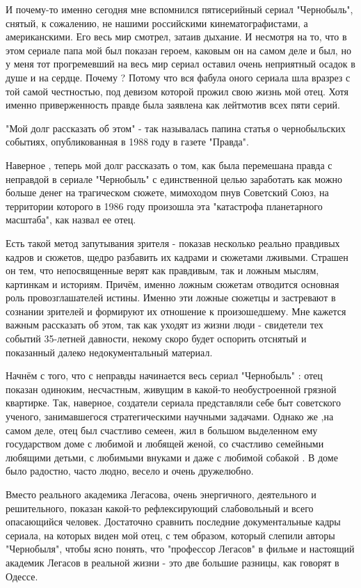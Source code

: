 И почему-то именно сегодня мне вспомнился пятисерийный сериал "Чернобыль",
снятый, к сожалению, не нашими российскими кинематографистами, а американскими.
Его весь мир смотрел, затаив дыхание. И несмотря на то, что в этом сериале папа
мой был показан героем, каковым он на самом деле и был, но у меня тот
прогремевший на весь мир сериал оставил очень неприятный осадок в душе и на
сердце. Почему ? Потому что вся фабула оного сериала шла вразрез с той самой
честностью, под девизом которой прожил свою жизнь мой отец. Хотя именно
приверженность правде была заявлена как лейтмотив всех пяти серий. 

"Мой долг рассказать об этом" - так называлась папина статья о чернобыльских
событиях, опубликованная в 1988 году в газете "Правда". 

Наверное , теперь мой долг рассказать о том, как была перемешана правда с
неправдой в сериале "Чернобыль" с единственной целью заработать как можно
больше денег на трагическом сюжете, мимоходом пнув Советский Союз, на
территории которого в 1986 году произошла эта "катастрофа планетарного
масштаба", как назвал ее отец. 

Есть такой метод запутывания зрителя - показав несколько реально правдивых
кадров и сюжетов, щедро разбавить их кадрами и сюжетами лживыми. Страшен он
тем, что непосвященные верят как правдивым, так и ложным мыслям, картинкам и
историям. Причём, именно ложным сюжетам отводится основная роль
провозглашателей истины. Именно эти ложные сюжетцы и застревают в сознании
зрителей и формируют их отношение к произошедшему. Мне кажется важным
рассказать об этом, так как уходят из жизни люди - свидетели тех событий
35-летней давности, некому скоро будет оспорить отснятый и показанный далеко
недокументальный материал. 

Начнём с того, что с неправды начинается весь сериал "Чернобыль" : отец показан
одиноким, несчастным, живущим в какой-то необустроенной грязной квартирке. Так,
наверное, создатели сериала представляли себе быт советского ученого,
занимавшегося стратегическими научными задачами. Однако же ,на самом деле, отец
был счастливо семеен, жил в большом выделенном ему государством доме с любимой
и любящей женой, со счастливо семейными любящими детьми, с любимыми внуками и
даже с любимой собакой . В доме было радостно, часто людно, весело и очень
дружелюбно. 

Вместо реального академика Легасова, очень энергичного, деятельного и
решительного, показан какой-то рефлексирующий слабовольный и всего опасающийся
человек. Достаточно сравнить последние документальные кадры сериала, на которых
виден мой отец,  с тем образом, который слепили авторы "Чернобыля", чтобы ясно
понять, что "профессор Легасов" в фильме и настоящий академик Легасов в
реальной жизни - это две большие разницы, как говорят в Одессе. 

